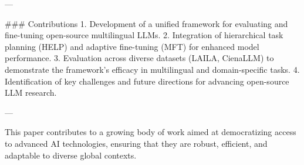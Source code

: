 ---

### Contributions  
1. Development of a unified framework for evaluating and fine-tuning open-source multilingual LLMs.  
2. Integration of hierarchical task planning (HELP) and adaptive fine-tuning (MFT) for enhanced model performance.  
3. Evaluation across diverse datasets (LAILA, CienaLLM) to demonstrate the framework's efficacy in multilingual and domain-specific tasks.  
4. Identification of key challenges and future directions for advancing open-source LLM research.  

--- 

This paper contributes to a growing body of work aimed at democratizing access to advanced AI technologies, ensuring that they are robust, efficient, and adaptable to diverse global contexts.